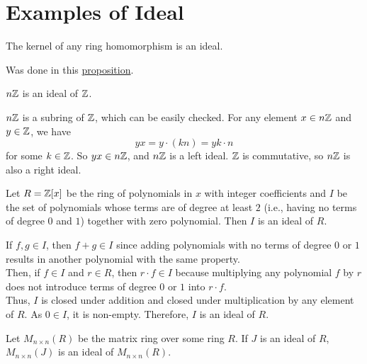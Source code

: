 \section{Examples of Ideal}
\begin{eg}
    The kernel of any ring homomorphism is an ideal.
\end{eg}
\begin{explanation}
    Was done in this \hyperref[def:kernelisideal]{proposition}.
\end{explanation}
\begin{eg}
    $n\mathbb{Z}$ is an ideal of $\mathbb{Z}$.
\end{eg}
\begin{explanation}
    $n\mathbb{Z}$ is a subring of $\mathbb{Z}$, which can be easily checked. For any element $x \in n\mathbb{Z}$ and $y \in \mathbb{Z}$, we have \[yx = y \cdot (kn) = yk \cdot n\]
    for some $k \in \mathbb{Z}$. So $yx \in n\mathbb{Z}$, and $n\mathbb{Z}$ is a left ideal. $\mathbb{Z}$ is commutative, so $n\mathbb{Z}$ is also a right ideal.
\end{explanation}
\begin{eg}
    Let $R = \mathbb{Z}[x]$ be the ring of polynomials in $x$ with integer coefficients and $I$ be the set of polynomials whose terms are of degree at least $2$ (i.e., having no terms of degree $0$ and $1$) together with zero polynomial. Then $I$ is an ideal of $R$.
\end{eg}
\begin{explanation}
If \( f, g \in I \), then \( f + g \in I \) since adding polynomials with no terms of degree \( 0 \) or \( 1 \) results in another polynomial with the same property.\\
Then, if \( f \in I \) and \( r \in R \), then \( r \cdot f \in I \) because multiplying any polynomial \( f \) by \( r \) does not introduce terms of degree \( 0 \) or \( 1 \) into \( r \cdot f \).\\
Thus, \( I \) is closed under addition and closed under multiplication by any element of $R$. As \( 0 \in I \), it is non-empty. Therefore, \( I \) is an ideal of \( R \).
\end{explanation}
\begin{eg}
    Let $M_{n \times n}(R)$ be the matrix ring over some ring $R$. If $J$ is an ideal of $R$, $M_{n\times n}(J)$ is an ideal of $M_{n \times n}(R)$.
\end{eg}
